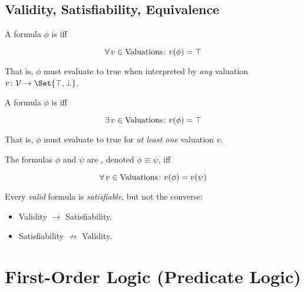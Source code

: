 \subsection{Validity, Satisfiability, Equivalence}

\begin{definition}[Valid]
    A formula $\phi$ is  iff
    
    \begin{equation}
        \operatorname{\forall} v \in \text{Valuations} \colon v(\phi) = \top
    \end{equation}
    
    That is, $\phi$ must evaluate to true when interpreted by \textit{any} 
    valuation $v \colon \mathcal{V} \to \Set{\top, \bot}$.
\end{definition}

\begin{definition}[Satisfiable]
    A formula $\phi$ is  iff
    
    \begin{equation}
        \operatorname{\exists} v \in \text{Valuations} \colon v(\phi) = \top
    \end{equation}
    
    That is, $\phi$ must evaluate to true for \textit{at least one} valuation 
    $v$.
\end{definition}

\begin{definition}[Equivalent]
    The formulas $\phi$ and $\psi$ are , denoted 
    $\phi \equiv \psi$, iff
    
    \begin{equation}
        \operatorname{\forall} v \in \text{Valuations} \colon v(\phi) = v(\psi)
    \end{equation}
\end{definition}

\begin{remark}
    Every \textit{valid} formula is \textit{satisfiable}, but not the converse:
    
    \begin{itemize}
        \item Validity $\to$ Satisfiability.
        \item Satisfiability $\not\to$ Validity.
    \end{itemize}
\end{remark}

\section{First-Order Logic (Predicate Logic)}

